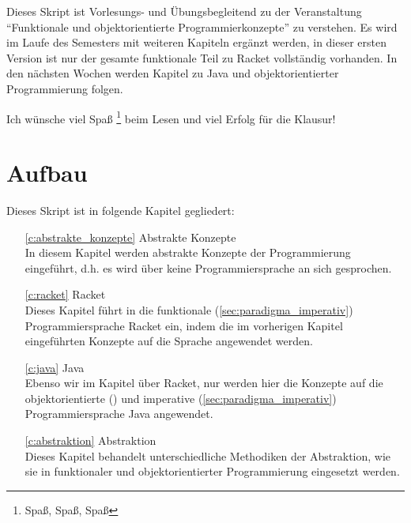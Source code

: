 Dieses Skript ist Vorlesungs- und Übungsbegleitend zu der Veranstaltung \enquote{Funktionale und objektorientierte Programmierkonzepte} zu verstehen. Es wird im Laufe des Semesters mit weiteren Kapiteln ergänzt werden, in dieser ersten Version ist nur der gesamte funktionale Teil zu Racket vollständig vorhanden. In den nächsten Wochen werden Kapitel zu Java und objektorientierter Programmierung folgen.

Ich wünsche viel Spaß \footnote{Spaß, Spaß, Spaß} beim Lesen und viel Erfolg für die Klausur!

\section{Aufbau}
	Dieses Skript ist in folgende Kapitel gegliedert:
	\begin{itemize}
		\item[\ref{c:abstrakte_konzepte}] Abstrakte Konzepte \\ In diesem Kapitel werden abstrakte Konzepte der Programmierung eingeführt, d.h. es wird über keine Programmiersprache an sich gesprochen.
		\item[\ref{c:racket}] Racket \\ Dieses Kapitel führt in die funktionale (\ref{sec:paradigma_imperativ}) Programmiersprache Racket ein, indem die im vorherigen Kapitel eingeführten Konzepte auf die Sprache angewendet werden.
		\item[\ref{c:java}] Java \\ Ebenso wir im Kapitel über Racket, nur werden hier die Konzepte auf die objektorientierte () und imperative (\ref{sec:paradigma_imperativ}) Programmiersprache Java angewendet.
		\item[\ref{c:abstraktion}] Abstraktion \\ Dieses Kapitel behandelt unterschiedliche Methodiken der Abstraktion, wie sie in funktionaler und objektorientierter Programmierung eingesetzt werden.
	\end{itemize}
